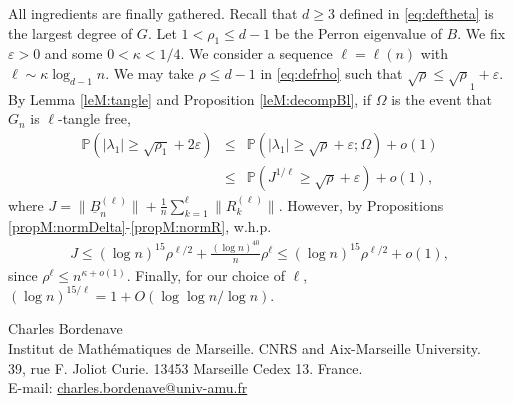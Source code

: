 \documentclass[11pt]{article}
\newcommand{\dP}{\mathbb{P}}
\newcommand{\PAR}[1]{{{\left(#1\right)}}} %
\newcommand{\uB}{{\underline B}}
\newcommand{\1}{1\!\!{\sf I}}\newcommand{\IND}{\1}
\newcommand{\veps}{\varepsilon}
\newcommand{\whp}{{w.h.p.~}}
\begin{document}
\label{subsecM:end}

All ingredients are finally gathered. Recall that $d \geq 3$ defined in \eqref{eq:deftheta} is the largest degree of $G$. Let $1 < \rho_1 \leq d-1$ be the Perron eigenvalue of $B$. We fix  $\veps > 0$ and some  $0 < \kappa < 1/4$. We consider a sequence $\ell = \ell (n)$ with $\ell \sim \kappa \log_{d-1} n$. We may take $\rho \leq d-1$ in \eqref{eq:defrho} such that $\sqrt \rho \leq \sqrt \rho_1 + \veps$.  By Lemma \ref{leM:tangle} and Proposition \ref{leM:decompBl}, if $\Omega$ is the event that $G_n$ is $\ell$-tangle free, 
\begin{eqnarray*}
\dP \PAR{|\lambda_1 | \geq \sqrt{\rho_1}  +  2 \veps} & \leq &\dP \PAR{|\lambda_1 | \geq \sqrt {\rho} + \veps ; \Omega} + o(1) \\
& \leq & \dP \PAR{ J^ { 1 /  \ell}  \geq   \sqrt {\rho} + \veps  } + o(1), 
\end{eqnarray*}
where $J = \|  \uB^{(\ell)}_{n} \|  + \frac 1{ n}   \sum_{k = 1}^\ell \| R_{k}^{(\ell)} \|.$
However, by Propositions \ref{propM:normDelta}-\ref{propM:normR}, \whp
\begin{align*}
J  \leq ( \log n )^{15} \rho^{\ell/2}   +  \frac {(\log n)^{40}  }{ n} \rho^{\ell}  \leq ( \log n )^{15} \rho^{\ell/2} + o(1),
\end{align*} since $\rho^\ell \leq  n^{\kappa +o(1)} $. Finally, for our choice of $\ell$, $(\log n)^{15 / \ell} = 1 + O ( \log \log n / \log n )$.











\bigskip
\noindent
 Charles Bordenave \\
 Institut de Math\'ematiques de Marseille. CNRS and Aix-Marseille University. \\
39, rue F. Joliot Curie. 13453 Marseille Cedex 13.  France. \\
\noindent
{E-mail:} \href{charles.bordenave@univ-amu.fr}{charles.bordenave@univ-amu.fr} \\
\end{document}
